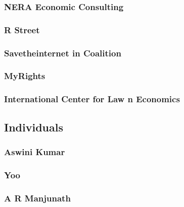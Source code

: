 \documentclass{article}
\begin{document}
\subsubsection{NERA Economic Consulting}


\subsubsection{R Street}


\subsubsection{Savetheinternet in Coalition}


\subsubsection{MyRights}


\subsubsection{International Center for Law n Economics}




\subsection{Individuals}
\subsubsection{Aswini Kumar}


\subsubsection{Yoo}


\subsubsection{A R Manjunath}

\end{document}
